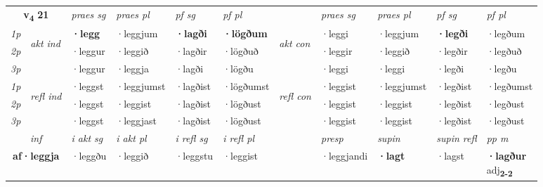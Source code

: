 \noindent
\begin{tabular}{lllllllllll} \toprule
\multicolumn{2}{c}{\textbf{v{\textsubscript{4}}} \Large{\textbf{21}}}  &  \textit{praes sg}  & \textit{praes pl}  &\textit{ pf sg} & \textit{pf pl} &  &  \textit{praes sg}  & \textit{praes pl}  & \textit{pf sg} & \textit{pf pl } \\*
	\cmidrule{3-6} \cmidrule{8-11}
 {\textit{1p}} & \multirow{3}{*}{\begin{turn}{90}\textit{akt ind}\end{turn}} & \textbf{·legg} & ·leggjum & \textbf{·lagði} & \textbf{·lögðum} & \multirow{3}{*}{\begin{turn}{90}\textit{akt con}\end{turn}} &·leggi & ·leggjum & \textbf{·legði} & ·legðum\\*
 {\textit{2p}} &  &  ·leggur  & ·leggið & ·lagðir & ·lögðuð & & ·leggir & ·leggið & ·legðir & ·legðuð \\*
{\textit{3p}} &  & ·leggur & ·leggja & ·lagði & ·lögðu & & ·leggi & ·leggi& ·legði & ·legðu \\*
\cmidrule{3-6} \cmidrule{8-11}
 {\textit{1p}} & \multirow{3}{*}{\begin{turn}{90}\textit{refl ind}\end{turn}}  & ·leggst & ·leggjumst & ·lagðist & ·lögðumst & \multirow{3}{*}{\begin{turn}{90}\textit{refl con}\end{turn}}  &·leggist & ·leggjumst & ·legðist & ·legðumst \\*
 {\textit{2p}} &  & ·leggst & ·leggist & ·lagðist & ·lögðust & &·leggist & ·leggist & ·legðist & ·legðust \\*
 {\textit{3p}}  & & ·leggst & ·leggjast & ·lagðist & ·lögðust & & ·leggist & ·leggist& ·legðist & ·legðust \\*
\cmidrule{3-6} \cmidrule{8-11}

   \multicolumn{2}{c}{\textit{inf}}  & \textit{i akt sg} & \textit{i akt pl} & \textit{i refl sg} & \textit{i refl pl} && \textit{presp} & \textit{supin} & \textit{supin refl} & \textit{pp m} \\*
  \multicolumn{2}{c}{\textbf{af\allowbreak ·leggja}} & ·leggðu  & ·leggið & ·leggstu & ·leggist && ·leggjandi &  \textbf{·lagt} & ·lagst & \specialcell{\textbf{·lagður} \\ adj\textbf{\textsubscript{2-2}}} \\*
\end{tabular}

